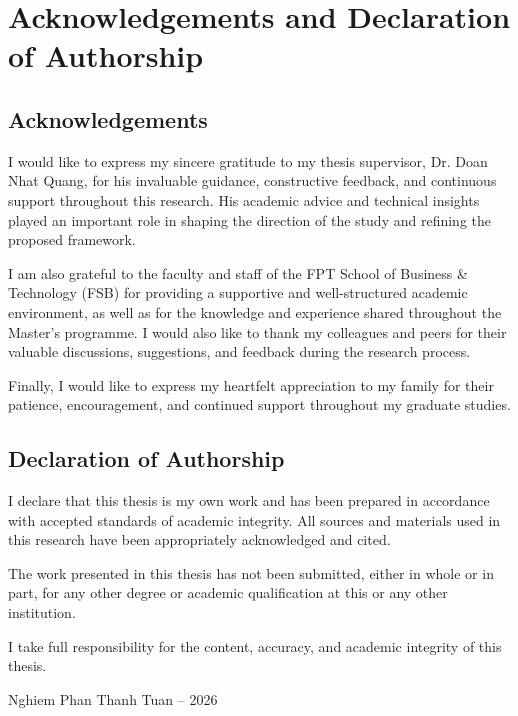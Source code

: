 \section*{Acknowledgements and Declaration of Authorship}
\thispagestyle{plain}

\subsection*{Acknowledgements}

I would like to express my sincere gratitude to my thesis supervisor, Dr. Doan Nhat Quang, for his invaluable guidance, constructive feedback, and continuous support throughout this research. His academic advice and technical insights played an important role in shaping the direction of the study and refining the proposed framework.

I am also grateful to the faculty and staff of the FPT School of Business \& Technology (FSB) for providing a supportive and well-structured academic environment, as well as for the knowledge and experience shared throughout the Master's programme. I would also like to thank my colleagues and peers for their valuable discussions, suggestions, and feedback during the research process.

Finally, I would like to express my heartfelt appreciation to my family for their patience, encouragement, and continued support throughout my graduate studies.

\subsection*{Declaration of Authorship}

I declare that this thesis is my own work and has been prepared in accordance with accepted standards of academic integrity. All sources and materials used in this research have been appropriately acknowledged and cited.

The work presented in this thesis has not been submitted, either in whole or in part, for any other degree or academic qualification at this or any other institution.

I take full responsibility for the content, accuracy, and academic integrity of this thesis.

Nghiem Phan Thanh Tuan -- 2026
